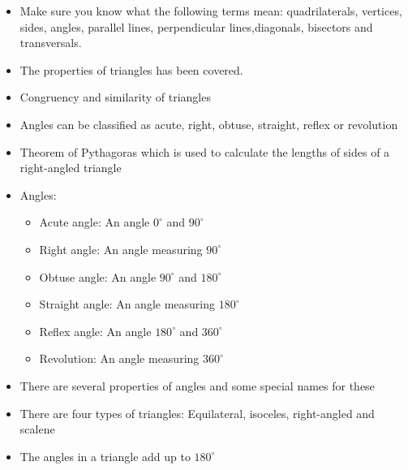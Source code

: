             \label{m39368*eip-439}\begin{itemize}[noitemsep]
            \item Make sure you know what the following terms mean: quadrilaterals, vertices, sides, angles, parallel lines, perpendicular lines,diagonals, bisectors and transversals.\item The properties of triangles has been covered.\item Congruency and similarity of triangles\item Angles can be classified as acute, right, obtuse, straight, reflex or revolution\item Theorem of Pythagoras which is used to calculate the lengths of sides of a right-angled triangle\item Angles: \label{m39368*id98732}\begin{itemize}[noitemsep]
            \item Acute angle: An angle \begin{math}{0}^{\circ }\end{math} and \begin{math}{90}^{\circ }\end{math}\item Right angle: An angle measuring \begin{math}{90}^{\circ }\end{math}\item Obtuse angle: An angle \begin{math}{90}^{\circ }\end{math} and \begin{math}{180}^{\circ }\end{math}\item Straight angle: An angle measuring \begin{math}{180}^{\circ }\end{math}\item Reflex angle: An angle \begin{math}{180}^{\circ }\end{math} and \begin{math}{360}^{\circ }\end{math}\item Revolution: An angle measuring \begin{math}{360}^{\circ }\end{math}\end{itemize}
        \item There are several properties of angles and some special names for these\item There are four types of triangles: Equilateral, isoceles, right-angled and scalene\item The angles in a triangle add up to \begin{math}{180}^{\circ }\end{math}\end{itemize}
        \label{m39368*cid6}
